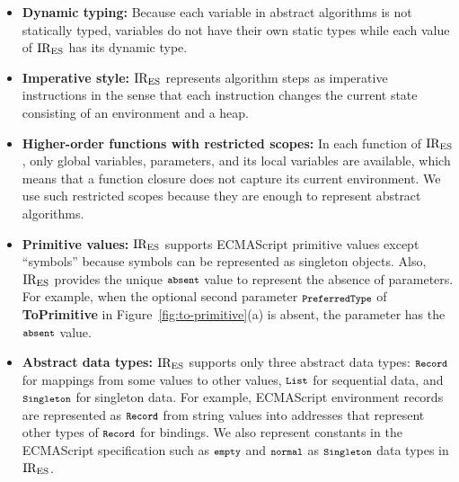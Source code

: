\begin{itemize}[leftmargin=0.5cm]
\item \textbf{Dynamic typing:} Because each variable in abstract
algorithms is not statically typed, variables do not have their own
static types while each value of \( \text{IR}_\text{ES} \) has its dynamic type.

\item \textbf{Imperative style:} \( \text{IR}_\text{ES} \) represents algorithm steps
as imperative instructions in the sense that each instruction changes
the current state consisting of an environment and a heap.

\item \textbf{Higher-order functions with restricted scopes:}
In each function of \( \text{IR}_\text{ES} \), only global variables, parameters,
and its local variables are available, which means that a function
closure does not capture its current environment.  We use such
restricted scopes because they are enough to represent abstract
algorithms.

\item \textbf{Primitive values:} \( \text{IR}_\text{ES} \) supports ECMAScript
primitive values except ``symbols'' because symbols can be represented
as singleton objects.  Also, \( \text{IR}_\text{ES} \) provides the unique \(
\texttt{\footnotesize absent} \) value to represent the absence of parameters.  For
example, when the optional second parameter \( \texttt{\footnotesize PreferredType} \)
of \textbf{ToPrimitive} in Figure~\ref{fig:to-primitive}(a) is absent,
the parameter has the \( \texttt{\footnotesize absent} \) value.

\item \textbf{Abstract data types:} \( \text{IR}_\text{ES} \) supports only three
abstract data types: \( \texttt{\footnotesize Record} \) for mappings from some values
to other values, \( \texttt{\footnotesize List} \) for sequential data, and
\( \texttt{\footnotesize Singleton} \) for singleton data.  For example, ECMAScript
environment records are represented as \( \texttt{\footnotesize Record} \)
from string values into addresses that represent other types of
\( \texttt{\footnotesize Record} \) for bindings.  We also represent constants
in the ECMAScript specification such as \( \texttt{\footnotesize empty} \)
and \( \texttt{\footnotesize normal} \) as \( \texttt{\footnotesize Singleton} \) data types
in \( \text{IR}_\text{ES} \).
\end{itemize}

